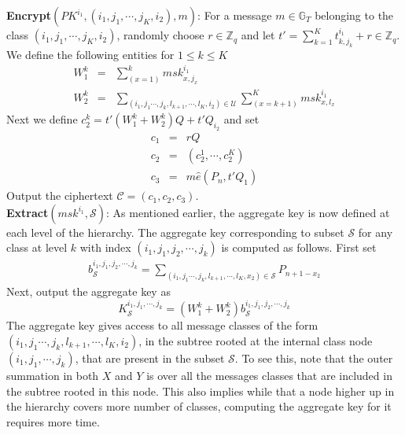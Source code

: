 \noindent \textbf{Encrypt}$(PK^{i_1},(i_1,j_1,\cdots,j_K,i_2),m)$: For a message $m \in \mathbb{G}_T$ belonging to the class $(i_1,j_1,\cdots,j_K,i_2)$, randomly choose $r\in\mathbb{Z}_q$ and let $t'=\sum_{k=1}^{K}t^{i_1}_{k,j_k}+r \in\mathbb{Z}_q$. We define the following entities for $1\leq k\leq K$
\begin{eqnarray}
 W^{k}_1 &=& \sum_{(x=1)}^{k}msk^{i_1}_{x,j_x}\nonumber\\
 W^{k}_2 &=& \sum_{(i_1,j_1\cdots,j_k,l_{k+1},\cdots,l_{K},i_2)\in\mathcal{U}}\sum_{(x=k+1)}^{K}msk^{i_1}_{x,l_x}  
\end{eqnarray}
\noindent Next we define $c^{k}_2 = t'(W^{k}_1+W^{k}_2)Q + t'Q_{i_2}$ and set
\begin{eqnarray} 
 c_1&=&rQ \nonumber\\
 c_2 &=& (c^{1}_2,\cdots,c^{K}_2)\nonumber\\
 c_3&=&m\hat{e}(P_{n},t'Q_1)\nonumber
\end{eqnarray}
\noindent Output the ciphertext $\mathcal{C}=(c_1,c_2,c_3)$.\\

\noindent \textbf{Extract}$(msk^{i_1},\mathcal{S})$: As mentioned earlier, the aggregate key is now defined at each level of the hierarchy. The aggregate key corresponding to subset $\mathcal{S}$ for any class at level $k$ with index $(i_1,j_1,j_2,\cdots,j_k)$ is computed as follows. First set 
\begin{eqnarray}
b^{i_1,j_1,j_2,\cdots,j_k}_{\mathcal{S}}=\sum_{(i_1,j_1\cdots,j_k,l_{k+1},\cdots,l_{K},x_2)\in \mathcal{S}}P_{n+1-x_2}\nonumber
\end{eqnarray}
\noindent Next, output the aggregate key as
\begin{equation}
K^{i_1,j_1,\cdots,j_k}_{\mathcal{S}} = (W^{k}_1 + W^{k}_2)b^{i_1,j_1,j_2,\cdots,j_k}_{\mathcal{S}}\nonumber
\end{equation}
\noindent The aggregate key gives access to all message classes of the form $(i_1,j_1\cdots,j_k,l_{k+1},\cdots,l_{K},i_2)$, in the subtree rooted at the internal class node $(i_1,j_1,\cdots,j_k)$, that are present in the subset $\mathcal{S}$. To see this, note that the outer summation in both $X$ and $Y$ is over all the messages classes that are included in the subtree rooted in this node. This also implies while that a node higher up in the hierarchy covers more number of classes, computing the aggregate key for it requires more time.\\

